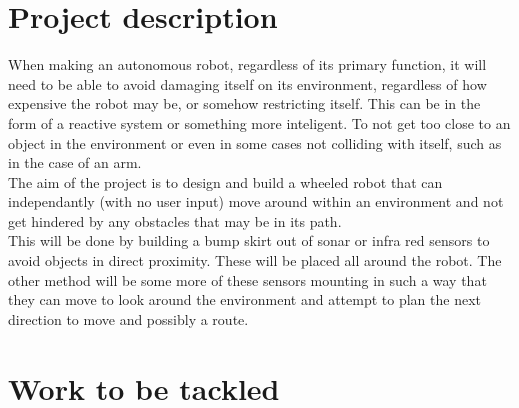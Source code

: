 \documentclass[11pt,fleqn,twoside]{article}
\begin{document}

\mmp

\setcounter{tocdepth}{3} %


\section{Project description}
When making an autonomous robot, regardless of its primary function, it will need to be able to avoid damaging itself on its environment, regardless of how expensive the robot may be, or somehow restricting itself.  This can be in the form of a reactive system or something more inteligent.  To not get too close to an object in the environment or even in some cases not colliding with itself, such as in the case of an arm.
\\The aim of the project is to design and build a wheeled robot that can independantly (with no user input) move around within an environment and not get hindered by any obstacles that may be in its path.
\\This will be done by building a bump skirt out of sonar or infra red sensors to avoid objects in direct proximity.  These will be placed all around the robot.  The other method will be some more of these sensors mounting in such a way that they can move to look around the environment and attempt to plan the next direction to move and possibly a route.
\section{Work to be tackled}
\end{document}
